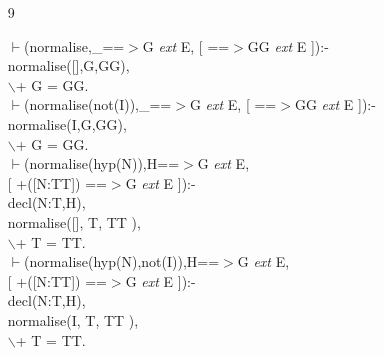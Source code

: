 \documentclass[11pt]{report}
\begin{document}
\begin{enumerate}
 \item[9]
\begin{sf}\begin{tabbing}
$\vdash$(normalise,\_\hspace{0.1em}==$>$G \mbox{\it ext} E, [ ==$>$GG \mbox{\it ext} E ]):-\\[-0.15ex]
\hspace{2em}normalise([],G,GG),\\[-0.15ex]
\hspace{2em}$\backslash$+ G = GG.  \\[-0.15ex]
$\vdash$(normalise(not(I)),\_\hspace{0.1em}==$>$G \mbox{\it ext} E, [ ==$>$GG \mbox{\it ext} E ]):-\\[-0.15ex]
\hspace{2em}normalise(I,G,GG),\\[-0.15ex]
\hspace{2em}$\backslash$+ G = GG.\\[-0.15ex]
$\vdash$(normalise(hyp(N)),H==$>$G \mbox{\it ext} E,\\[-0.15ex]
\hspace{4em}[ +([N:TT]) ==$>$G \mbox{\it ext} E ]):-\\[-0.15ex]
\hspace{2em}decl(N:T,H),\\[-0.15ex]
\hspace{2em}normalise([], T, TT ),\\[-0.15ex]
\hspace{2em}$\backslash$+ T = TT.  \\[-0.15ex]
$\vdash$(normalise(hyp(N),not(I)),H==$>$G \mbox{\it ext} E,\\[-0.15ex]
\hspace{4em}[ +([N:TT]) ==$>$G \mbox{\it ext} E ]):-\\[-0.15ex]
\hspace{2em}decl(N:T,H),\\[-0.15ex]
\hspace{2em}normalise(I, T, TT ),\\[-0.15ex]
\hspace{2em}$\backslash$+ T = TT.  \\[-0.7ex]
\\[-0.7ex]

\end{tabbing}\end{sf}


\end{enumerate}
\end{document}

